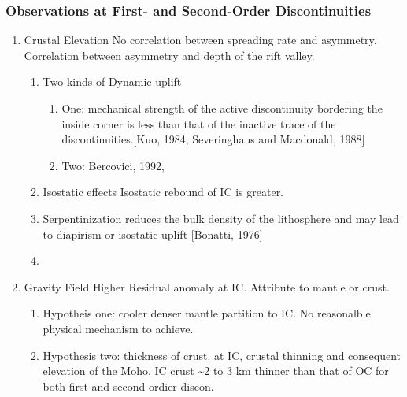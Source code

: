 \documentclass[11pt]{article}
\begin{document}
\subsubsection{Observations at First- and Second-Order Discontinuities}
\label{sec-1-1-2}
\begin{enumerate}
\item Crustal Elevation
\label{sec-1-1-2-1}
No correlation between spreading rate and asymmetry. Correlation between asymmetry and depth of the rift valley.
\begin{enumerate}
\item Two kinds of Dynamic uplift
\label{sec-1-1-2-1-1}
\begin{enumerate}
\item One: mechanical strength of the active discontinuity bordering the inside corner is less than that of the inactive trace of the discontinuities.[Kuo, 1984; Severinghaus and Macdonald, 1988]
\label{sec-1-1-2-1-1-1}
\item Two: Bercovici, 1992, 
\label{sec-1-1-2-1-1-2}
\end{enumerate}
\item Isostatic effects
\label{sec-1-1-2-1-2}
Isostatic rebound of IC is greater.
\item Serpentinization reduces the bulk density of the lithosphere and may lead to diapirism or isostatic uplift [Bonatti, 1976]
\label{sec-1-1-2-1-3}
\item {}
\label{sec-1-1-2-1-4}
\end{enumerate}
\item Gravity Field
\label{sec-1-1-2-2}
Higher Residual anomaly at IC. Attribute to mantle or crust.
\begin{enumerate}
\item Hypotheis one: cooler denser mantle partition to IC. No reasonalble physical mechanism to achieve.
\label{sec-1-1-2-2-1}
\item Hypothesis two: thickness of crust.  at IC, crustal thinning and consequent elevation of the Moho. IC crust \textasciitilde{}2 to 3 km thinner than that of OC for both first and second ordier discon.

\end{enumerate}
\end{enumerate}
\end{document}

